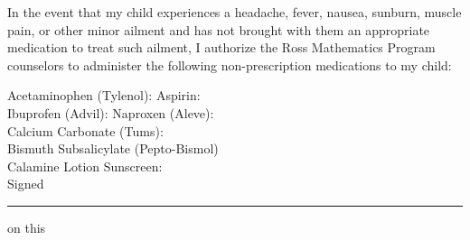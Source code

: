 \documentclass{ross}
\begin{document}
\pagebreak
In the event that my child experiences a headache, fever, nausea,
sunburn, muscle pain, or other minor ailment and has not brought with
them an appropriate medication to treat such ailment, I authorize the
Ross Mathematics Program counselors to administer the following
non-prescription medications to my child:

Acetaminophen (Tylenol):  \hfill Aspirin:  \\
Ibuprofen (Advil):    \hfill Naproxen (Aleve):   \\
\hfill Calcium Carbonate (Tums):  \\
Bismuth Subsalicylate (Pepto-Bismol)   \\
Calamine Lotion  \hfill Sunscreen:   \\

\vspace{0.25in}
Signed \rule{3in}{.1mm}  on this  \\[-5pt]
\hspace*{1in}{\scriptsize \textcolor{gray}{Parent or legal guardian} }

\end{document}
